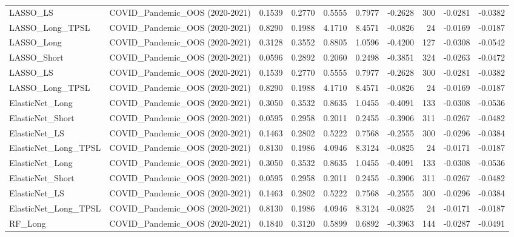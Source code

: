 \begin{tabular}{llrrrrrrrr}
\cline{1-10}
LASSO\_LS & COVID\_Pandemic\_OOS (2020-2021) & 0.1539 & 0.2770 & 0.5555 & 0.7977 & -0.2628 & 300 & -0.0281 & -0.0382 \\
\cline{1-10}
LASSO\_Long\_TPSL & COVID\_Pandemic\_OOS (2020-2021) & 0.8290 & 0.1988 & 4.1710 & 8.4571 & -0.0826 & 24 & -0.0169 & -0.0187 \\
\cline{1-10}
LASSO\_Long & COVID\_Pandemic\_OOS (2020-2021) & 0.3128 & 0.3552 & 0.8805 & 1.0596 & -0.4200 & 127 & -0.0308 & -0.0542 \\
\cline{1-10}
LASSO\_Short & COVID\_Pandemic\_OOS (2020-2021) & 0.0596 & 0.2892 & 0.2060 & 0.2498 & -0.3851 & 324 & -0.0263 & -0.0472 \\
\cline{1-10}
LASSO\_LS & COVID\_Pandemic\_OOS (2020-2021) & 0.1539 & 0.2770 & 0.5555 & 0.7977 & -0.2628 & 300 & -0.0281 & -0.0382 \\
\cline{1-10}
LASSO\_Long\_TPSL & COVID\_Pandemic\_OOS (2020-2021) & 0.8290 & 0.1988 & 4.1710 & 8.4571 & -0.0826 & 24 & -0.0169 & -0.0187 \\
\cline{1-10}
ElasticNet\_Long & COVID\_Pandemic\_OOS (2020-2021) & 0.3050 & 0.3532 & 0.8635 & 1.0455 & -0.4091 & 133 & -0.0308 & -0.0536 \\
\cline{1-10}
ElasticNet\_Short & COVID\_Pandemic\_OOS (2020-2021) & 0.0595 & 0.2958 & 0.2011 & 0.2455 & -0.3906 & 311 & -0.0267 & -0.0482 \\
\cline{1-10}
ElasticNet\_LS & COVID\_Pandemic\_OOS (2020-2021) & 0.1463 & 0.2802 & 0.5222 & 0.7568 & -0.2555 & 300 & -0.0296 & -0.0384 \\
\cline{1-10}
ElasticNet\_Long\_TPSL & COVID\_Pandemic\_OOS (2020-2021) & 0.8130 & 0.1986 & 4.0946 & 8.3124 & -0.0825 & 24 & -0.0171 & -0.0187 \\
\cline{1-10}
ElasticNet\_Long & COVID\_Pandemic\_OOS (2020-2021) & 0.3050 & 0.3532 & 0.8635 & 1.0455 & -0.4091 & 133 & -0.0308 & -0.0536 \\
\cline{1-10}
ElasticNet\_Short & COVID\_Pandemic\_OOS (2020-2021) & 0.0595 & 0.2958 & 0.2011 & 0.2455 & -0.3906 & 311 & -0.0267 & -0.0482 \\
\cline{1-10}
ElasticNet\_LS & COVID\_Pandemic\_OOS (2020-2021) & 0.1463 & 0.2802 & 0.5222 & 0.7568 & -0.2555 & 300 & -0.0296 & -0.0384 \\
\cline{1-10}
ElasticNet\_Long\_TPSL & COVID\_Pandemic\_OOS (2020-2021) & 0.8130 & 0.1986 & 4.0946 & 8.3124 & -0.0825 & 24 & -0.0171 & -0.0187 \\
\cline{1-10}
RF\_Long & COVID\_Pandemic\_OOS (2020-2021) & 0.1840 & 0.3120 & 0.5899 & 0.6892 & -0.3963 & 144 & -0.0287 & -0.0491 \\

\end{tabular}
